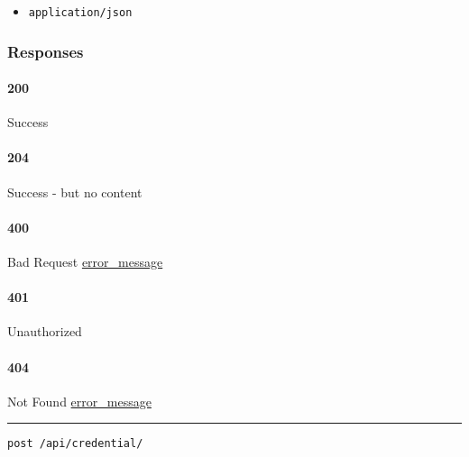 \begin{itemize}
\tightlist
\item
  \texttt{application/json}
\end{itemize}

\hypertarget{responses-59}{%
\subsubsection{Responses}\label{responses-59}}

\hypertarget{section-194}{%
\paragraph{200}\label{section-194}}

Success \protect\hyperlink{}{}

\hypertarget{section-195}{%
\paragraph{204}\label{section-195}}

Success - but no content \protect\hyperlink{}{}

\hypertarget{section-196}{%
\paragraph{400}\label{section-196}}

Bad Request \protect\hyperlink{error_message}{error\_message}

\hypertarget{section-197}{%
\paragraph{401}\label{section-197}}

Unauthorized \protect\hyperlink{}{}

\hypertarget{section-198}{%
\paragraph{404}\label{section-198}}

Not Found \protect\hyperlink{error_message}{error\_message}

\begin{center}\rule{0.5\linewidth}{\linethickness}\end{center}

\protect\hypertarget{apiCredentialPost}{}{}

\begin{verbatim}
post /api/credential/
\end{verbatim}

